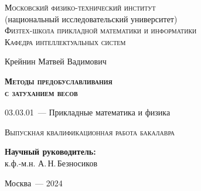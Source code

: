 \thispagestyle{empty}

\begin{titlepage}
    \begin{center}
        \textsc{Московский физико-технический институт}\\
        (национальный исследовательский университет)\\
        \textsc{Физтех-школа прикладной математики и информатики}\\
        \textsc{Кафедра интеллектуальных систем}
        \end{center}
        \vspace{2.5cm}
        \begin{center}
        {Крейнин Матвей Вадимович}
        \par
        \vspace{2cm}
        {\Large \textsc{\textbf{Методы предобуславливания \\ с затуханием весов}}}
        \par
        \vspace{2cm}
        {03.03.01~--- Прикладные математика и физика}
        \par
        \vspace{2cm}
        \textsc{Выпускная квалификационная работа бакалавра}
        \end{center}
        \vspace{2cm}
        \hfill\parbox{8,4cm}{\textbf{Научный руководитель:}
        \\к.ф.-м.н. А.\,Н.\,Безносиков}
        \par
        \vspace{2.5cm}
        \begin{center}
        {Москва~--- 2024}
    \end{center}
\end{titlepage}